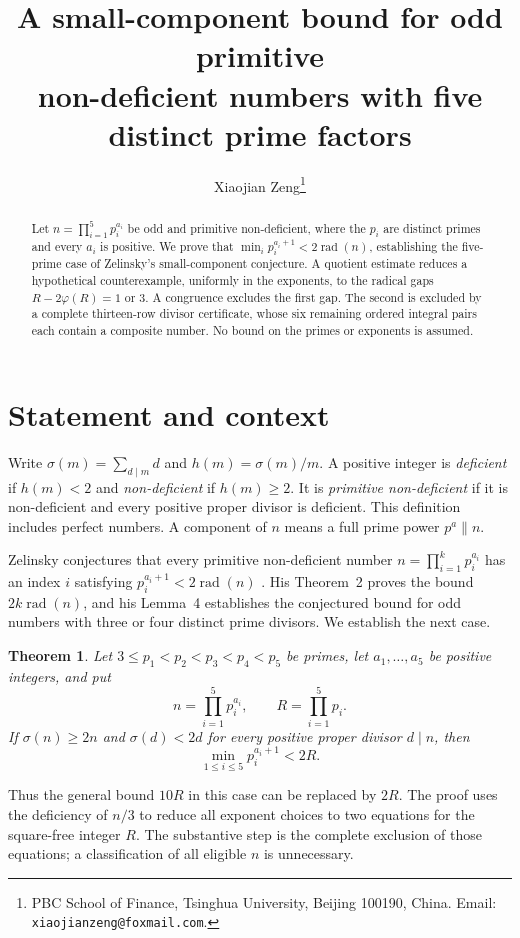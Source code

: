 \documentclass[11pt]{article}
\title{A small-component bound for odd primitive\protect\\
non-deficient numbers with five distinct prime factors}
\author{Xiaojian Zeng\thanks{PBC School of Finance, Tsinghua University,
Beijing 100190, China. Email: \texttt{xiaojianzeng@foxmail.com}.}}
\date{}
\newtheorem{theorem}{Theorem}
\DeclareMathOperator{\rad}{rad}
\newcommand{\ph}{\varphi}
\begin{document}
\maketitle
\begin{abstract}
Let $n=\prod_{i=1}^{5}p_i^{a_i}$ be odd and primitive non-deficient,
where the $p_i$ are distinct primes and every $a_i$ is positive.
We prove that $\min_i p_i^{a_i+1}<2\rad(n)$, establishing the
five-prime case of Zelinsky's small-component conjecture.
A quotient estimate reduces a hypothetical counterexample, uniformly in
the exponents, to the radical gaps $R-2\ph(R)=1$ or $3$.
A congruence excludes the first gap. The second is excluded by a complete
thirteen-row divisor certificate, whose six remaining ordered integral
pairs each contain a composite number. No bound on the primes or
exponents is assumed.
\end{abstract}

\section{Statement and context}

Write $\sigma(m)=\sum_{d\mid m}d$ and $h(m)=\sigma(m)/m$.
A positive integer is \emph{deficient} if $h(m)<2$ and
\emph{non-deficient} if $h(m)\ge2$. It is \emph{primitive
non-deficient} if it is non-deficient and every positive proper divisor
is deficient. This definition includes perfect numbers.
A component of $n$ means a full prime power $p^a\parallel n$.

Zelinsky conjectures that every primitive non-deficient number
$n=\prod_{i=1}^{k}p_i^{a_i}$ has an index $i$ satisfying
$p_i^{a_i+1}<2\rad(n)$ \cite[Conjecture~1]{Zelinsky2026}.
His Theorem~2 proves the bound $2k\rad(n)$, and his Lemma~4 establishes
the conjectured bound for odd numbers with three or four distinct prime
divisors. We establish the next case.

\begin{theorem}\label{thm:main}
Let $3\le p_1<p_2<p_3<p_4<p_5$ be primes, let
$a_1,\ldots,a_5$ be positive integers, and put
\[
 n=\prod_{i=1}^{5}p_i^{a_i},\qquad R=\prod_{i=1}^{5}p_i.
\]
If $\sigma(n)\ge2n$ and $\sigma(d)<2d$ for every positive proper
divisor $d\mid n$, then
\[
 \min_{1\le i\le5}p_i^{a_i+1}<2R.
\]
\end{theorem}

Thus the general bound $10R$ in this case can be replaced by $2R$.
The proof uses the deficiency of $n/3$ to reduce all exponent choices
to two equations for the square-free integer $R$. The substantive step
is the complete exclusion of those equations; a classification of all
eligible $n$ is unnecessary.
\end{document}
